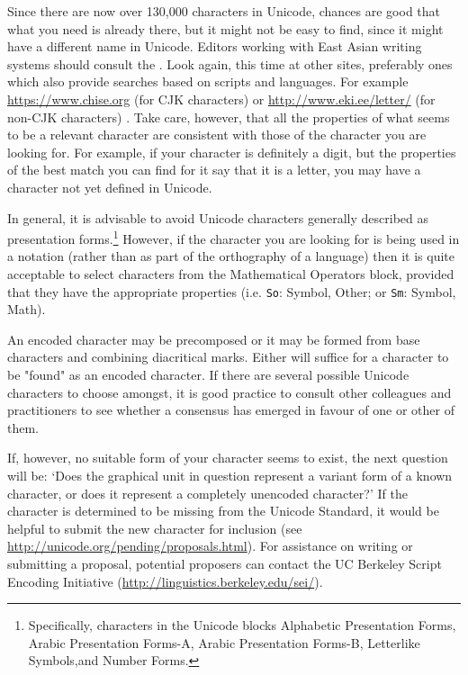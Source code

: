 Since there are now over 130,000 characters in Unicode, chances are good that what you need is already there, but it might not be easy to find, since it might have a different name in Unicode. Editors working with East Asian writing systems should consult the . Look again, this time at other sites, preferably ones which also provide searches based on scripts and languages. For example \url{https://www.chise.org} (for CJK characters) or \url{http://www.eki.ee/letter/} (for non-CJK characters) . Take care, however, that all the properties of what seems to be a relevant character are consistent with those of the character you are looking for. For example, if your character is definitely a digit, but the properties of the best match you can find for it say that it is a letter, you may have a character not yet defined in Unicode.\par
In general, it is advisable to avoid Unicode characters generally described as presentation forms.\footnote{Specifically, characters in the Unicode blocks Alphabetic Presentation Forms, Arabic Presentation Forms-A, Arabic Presentation Forms-B, Letterlike Symbols,and Number Forms.} However, if the character you are looking for is being used in a notation (rather than as part of the orthography of a language) then it is quite acceptable to select characters from the Mathematical Operators block, provided that they have the appropriate properties (i.e. \texttt{So}: Symbol, Other; or \texttt{Sm}: Symbol, Math).\par
An encoded character may be precomposed or it may be formed from base characters and combining diacritical marks. Either will suffice for a character to be "found" as an encoded character. If there are several possible Unicode characters to choose amongst, it is good practice to consult other colleagues and practitioners to see whether a consensus has emerged in favour of one or other of them.\par
If, however, no suitable form of your character seems to exist, the next question will be: ‘Does the graphical unit in question represent a variant form of a known character, or does it represent a completely unencoded character?’ If the character is determined to be missing from the Unicode Standard, it would be helpful to submit the new character for inclusion (see \url{http://unicode.org/pending/proposals.html}). For assistance on writing or submitting a proposal, potential proposers can contact the UC Berkeley Script Encoding Initiative (\url{http://linguistics.berkeley.edu/sei/}).\par
